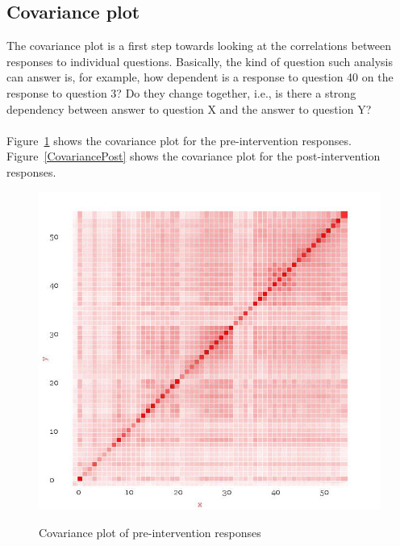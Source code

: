 \documentclass[10pt]{article}
\begin{document}
\subsection{Covariance plot}
The covariance plot is a first step towards looking at the correlations between responses to individual questions. Basically, the kind of question such analysis can answer is, for example, how dependent is a response to question 40 on the response to question 3? Do they change together, i.e., is there a strong dependency between answer to question X and the answer to question Y?\\\\
Figure~\ref{CovariancePre} shows the covariance plot for the pre-intervention responses.\\
Figure~\ref{CovariancePost} shows the covariance plot for the post-intervention responses.\\
\begin{figure}
\caption{Covariance plot of pre-intervention responses}
\label{CovariancePre}
\begin{center}
\includegraphics[width=120mm]{ReportMedia/CovariancePre.jpg}\\
\end{center}
\end{figure}
\end{document}
